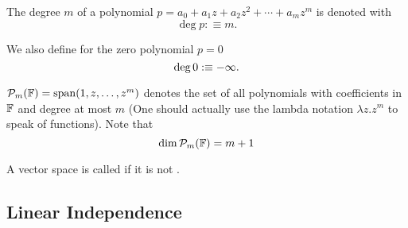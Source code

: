 \begin{mydef}
  The degree $m$ of a polynomial $p=a_0+a_1z+a_2z^2+\cdots+a_mz^m$ is denoted with \begin{equation}
    \deg p :\equiv m.
  \end{equation}
  
  We also define for the zero polynomial $p=0$ 
  \begin{equation}
    {\operatorname{deg} \,} 0 : \equiv -\infty.
  \end{equation}
\end{mydef}

\begin{mydef}
  $\mathcal{P}_m (\mathbb{F} )=\operatorname{span} (1,z,\dots,z^m)$ denotes the set of all polynomials with coefficients in $\mathbb{F}$ and degree at most $m$ (One should actually use the lambda notation $\lambda z.z^m$ to speak of functions). Note that
  \begin{equation}
    \dim \mathcal{P}_m(\mathbb{F}) = m+1
  \end{equation}
\end{mydef}

\setcounter{thm}{12}
\begin{mydef}
  A vector space is called  if it is not \fd. 
\end{mydef}


\subsection{Linear Independence}

